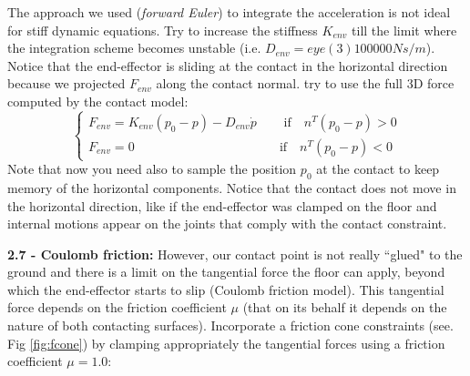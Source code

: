 \documentclass[11pt]{article}
\begin{document}
The approach we used (\textit{forward Euler}) to integrate the acceleration is not ideal for stiff dynamic equations. Try to increase the stiffness $K_{env}$ till the limit where the integration scheme becomes unstable (i.e. $D_{env} = eye(3)100000 Ns/m$).
Notice that the end-effector is  sliding at the contact in the horizontal direction because we projected $F_{env}$ along the contact normal.
try to use the full 3D force computed by the contact model:
%
\begin{equation*}
\begin{cases}
F_{env} = K_{env}(p_0 - p) - D_{env} \dot{p} \quad &\text{   if}\quad n^T(p_0 -p ) >0 \\ 
F_{env} = 0     \quad &\text{if}\quad n^T(p_0 -p ) <0
\end{cases}
\end{equation*}
%
Note that now you need also to sample the position $p_0$ at the contact to keep memory of the horizontal components.
Notice that the contact does not move in the horizontal direction, like if the end-effector was clamped on the floor and internal motions appear on the joints that comply with the contact constraint. 

\quad

\noindent
\textbf{ 2.7 - Coulomb friction:} 
However, our contact point is not really ``glued" to the ground and there is a limit on the tangential force the floor can apply,  
beyond which the end-effector starts to slip (Coulomb friction model).  This tangential force depends on the friction coefficient $\mu$ (that on its behalf it depends on the nature of both contacting surfaces). Incorporate a friction cone constraints (see. Fig \ref{fig:fcone}) by clamping  appropriately the tangential forces using  a friction coefficient $\mu = 1.0$:
\end{document}
